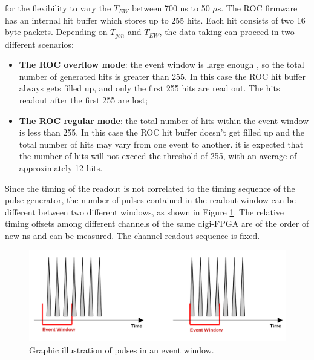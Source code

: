     for the flexibility to vary the $T_{EW}$ between 700 ns to 50 
    $\mu$s. The ROC firmware has an internal hit buffer which stores up to 255 hits. 
    Each hit consists of two 16 byte packets.
    Depending on $T_{gen}$ and $T_{EW}$, the data taking can proceed in two different
    scenarios:
    \begin{itemize}
    \item \textbf{The ROC overflow mode}: the event window is large enough , 
    so the total number of generated hits is 
      greater than 255. In this case
      the ROC hit buffer always gets filled up, and only the first 255 hits are read out. 
      The hits readout after the first 255 are lost;
    \item \textbf{The ROC regular mode}: the total number of hits 
      within the event window is less than 255.
      In this case the ROC hit buffer doesn't get filled up and the total number of 
      hits may vary from one event to another. it is expected that the number 
      of hits will not exceed the threshold of 255, with an average of approximately 12 hits.
    \end{itemize}
    Since the timing of the readout is not correlated to the timing sequence 
    of the pulse generator, the number of pulses contained in the readout window
     can be different between two different windows, as shown 
    in Figure \ref{fig:3}. The relative timing offsets among different channels of 
    the same digi-FPGA are of the order of new ns and can be measured. 
    The channel readout sequence is fixed.
    \begin{figure}[!h]
    \centering
    \includegraphics[width =1\textwidth]{figures/png/finalimg.png}
    \caption{Graphic illustration of pulses in an event window.}
    \label{fig:3}
    \end{figure}
  
